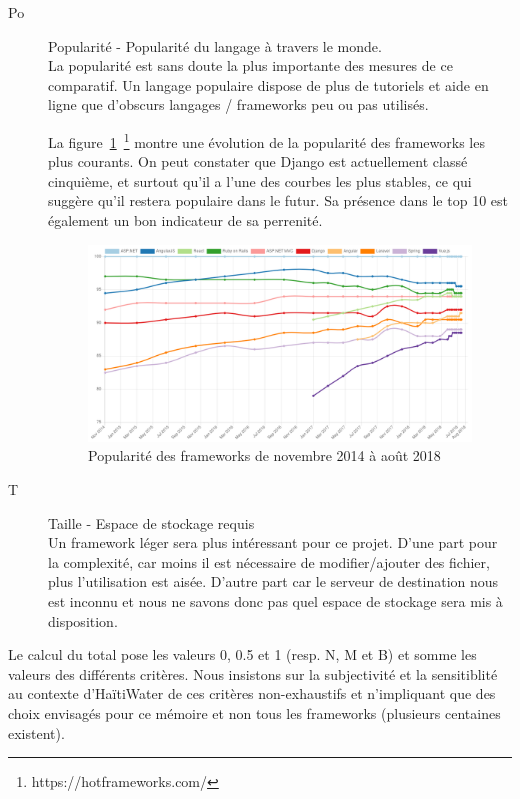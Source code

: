 \documentclass{EPL-master-thesis-covers-FR}
\begin{document}
\begin{description}
					\item[Po] Popularité - Popularité du langage à travers le monde. \hfill \\
							La popularité est sans doute la plus importante des mesures de ce comparatif. Un langage populaire dispose de plus de tutoriels et aide en ligne que d'obscurs langages / frameworks peu ou pas utilisés.

							La figure~\ref{fig:hotframework}~\footnote{https://hotframeworks.com/} montre une évolution de la popularité des frameworks les plus courants. On peut constater que Django est actuellement classé cinquième, et surtout qu'il a l'une des courbes les plus stables, ce qui suggère qu'il restera populaire dans le futur. Sa présence dans le top 10 est également un bon indicateur de sa perrenité.

							\begin{figure}
								\centering
								\includegraphics[width=\textwidth]{images/hotframework.png}
								\caption{Popularité des frameworks de novembre 2014 à août 2018}
								\label{fig:hotframework}
							\end{figure}

					\item[T] Taille - Espace de stockage requis \hfill \\
							Un framework léger sera plus intéressant pour ce projet. D'une part pour la complexité, car moins il est nécessaire de modifier/ajouter des fichier, plus l'utilisation est aisée. D'autre part car le serveur de destination nous est inconnu et nous ne savons donc pas quel espace de stockage sera mis à disposition.
				\end{description}

				Le calcul du total pose les valeurs 0, 0.5 et 1 (resp. N, M et B) et somme les valeurs des différents critères. Nous insistons sur la subjectivité et la sensitiblité au contexte d'HaïtiWater de ces critères non-exhaustifs et n'impliquant que des choix envisagés pour ce mémoire et non tous les frameworks (plusieurs centaines existent).
\end{document}
